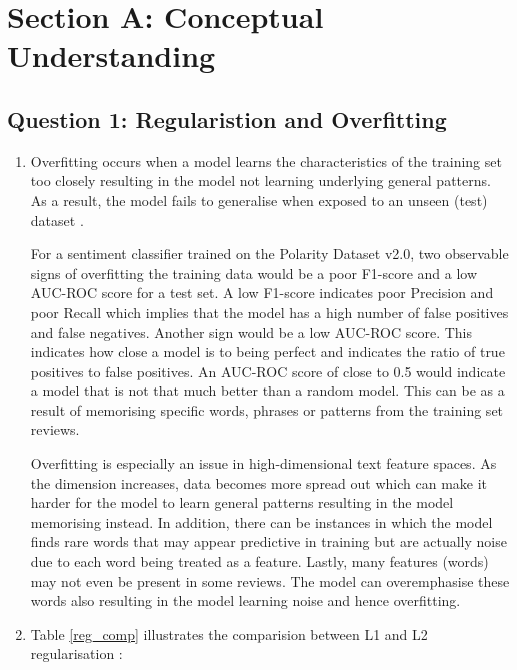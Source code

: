 \section{Section A: Conceptual Understanding}

\subsection{Question 1: Regularistion and Overfitting}

\begin{enumerate}[label=\textbf{(\alph*)}, leftmargin=*, align=left]
    \item Overfitting occurs when a model learns the characteristics of the training set too closely resulting in the model not learning underlying general patterns. As a result, 
          the model fails to generalise when exposed to an unseen (test) dataset \parencite{geron2019hands}.
    
          For a sentiment classifier trained on the Polarity Dataset v2.0, two observable signs of overfitting the training data would be a poor F1-score and a low AUC-ROC score for a test set.
          A low F1-score indicates poor Precision and poor Recall which implies that the model has a high number of false positives and false negatives. Another sign would be a low AUC-ROC score.
          This indicates how close a model is to being perfect and indicates the ratio of true positives to false positives. An AUC-ROC score of close to 0.5 would indicate a model that is not that
          much better than a random model. This can be as a result of memorising specific words, phrases or patterns from the training set reviews.

          Overfitting is especially an issue in high-dimensional text feature spaces. As the dimension increases, data becomes more spread out which can make it harder for the model to 
          learn general patterns resulting in the model memorising instead. In addition, there can be instances in which the model finds rare words that may appear predictive in training
          but are actually noise due to each word being treated as a feature. Lastly, many features (words) may not even be present in some reviews. The model can overemphasise these words
          also resulting in the model learning noise and hence overfitting.

    \newpage
    
    \item   Table \ref{reg_comp} illustrates the comparision between L1 and L2 regularisation \parencite{geron2019hands}:
    

\end{enumerate}
